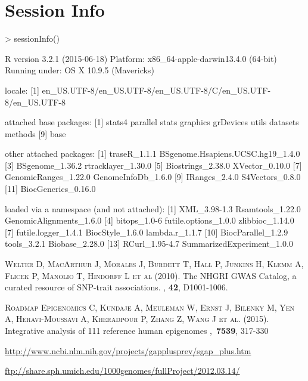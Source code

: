 \documentclass{article}
\begin{document}
\section{Session Info}
\begin{Schunk}
\begin{Sinput}
> sessionInfo()
\end{Sinput}
\begin{Soutput}
R version 3.2.1 (2015-06-18)
Platform: x86_64-apple-darwin13.4.0 (64-bit)
Running under: OS X 10.9.5 (Mavericks)

locale:
[1] en_US.UTF-8/en_US.UTF-8/en_US.UTF-8/C/en_US.UTF-8/en_US.UTF-8

attached base packages:
[1] stats4    parallel  stats     graphics  grDevices utils     datasets  methods  
[9] base     

other attached packages:
 [1] traseR_1.1.1                      BSgenome.Hsapiens.UCSC.hg19_1.4.0
 [3] BSgenome_1.36.2                   rtracklayer_1.30.0               
 [5] Biostrings_2.38.0                 XVector_0.10.0                   
 [7] GenomicRanges_1.22.0              GenomeInfoDb_1.6.0               
 [9] IRanges_2.4.0                     S4Vectors_0.8.0                  
[11] BiocGenerics_0.16.0              

loaded via a namespace (and not attached):
 [1] XML_3.98-1.3               Rsamtools_1.22.0           GenomicAlignments_1.6.0   
 [4] bitops_1.0-6               futile.options_1.0.0       zlibbioc_1.14.0           
 [7] futile.logger_1.4.1        BiocStyle_1.6.0            lambda.r_1.1.7            
[10] BiocParallel_1.2.9         tools_3.2.1                Biobase_2.28.0            
[13] RCurl_1.95-4.7             SummarizedExperiment_1.0.0
\end{Soutput}
\end{Schunk}

\begin{thebibliography}{99}

\textsc{Welter D, MacArthur J, Morales J, Burdett T, Hall P, Junkins H, Klemm A, Flicek P, Manolio T, Hindorff L et al} (2010).
\newblock The NHGRI GWAS Catalog, a curated resource of SNP-trait associations. 
, {\bf 42}, D1001-1006.

\textsc{Roadmap Epigenomics C, Kundaje A, Meuleman W, Ernst J, Bilenky M, Yen A, Heravi-Moussavi A, Kheradpour P, Zhang Z, Wang J et al}. (2015).
\newblock Integrative analysis of 111 reference human epigenomes
,~\textbf{7539}, 317-330

\newblock \url{http://www.ncbi.nlm.nih.gov/projects/gapplusprev/sgap_plus.htm}

\newblock \url{ftp://share.sph.umich.edu/1000genomes/fullProject/2012.03.14/}

\end{thebibliography}
\end{document}
